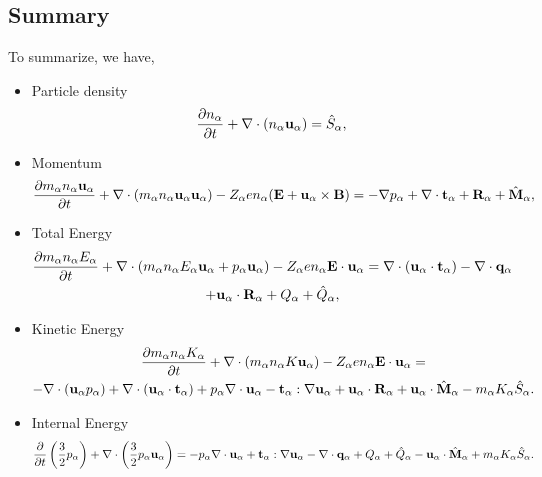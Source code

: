 \documentclass[a4paper,11pt]{report}
\begin{document}
\subsection{Summary}
To summarize, we have,
\begin{itemize}
    \item Particle density
\begin{equation}
\label{eq:cons_mass}
    \frac{\partial n_\alpha}{\partial t} + \nabla \cdot \left ( n_\alpha \mathbf{u}_\alpha \right ) = \hat{S}_\alpha,
\end{equation}

    \item Momentum
\begin{equation}
\label{eq:cons_mom}
    \frac{\partial m_\alpha n_\alpha \mathbf{u}_\alpha}{\partial t} + \nabla \cdot \left ( m_\alpha n_\alpha \mathbf{u}_\alpha \mathbf{u}_\alpha \right) - Z_\alpha e n_\alpha ( \mathbf{E} + \mathbf{u}_\alpha \times \mathbf{B} ) = - \nabla p_\alpha + \nabla \cdot \mathbf{t}_\alpha + \mathbf{R}_\alpha + \hat{\mathbf{M}}_\alpha,
\end{equation}

    \item Total Energy
\begin{multline}
\label{eq:cons_te}
\frac{\partial m_\alpha n_\alpha E_\alpha}{\partial t} + \nabla \cdot (m_\alpha n_\alpha E_\alpha \mathbf{u}_\alpha + p_\alpha \mathbf{u}_\alpha ) - Z_\alpha e n_\alpha \mathbf{E} \cdot \mathbf{u}_\alpha = \nabla \cdot ( \mathbf{u}_\alpha \cdot \mathbf{t}_\alpha ) - \nabla \cdot \mathbf{q}_\alpha \\
+ \mathbf{u}_\alpha \cdot \mathbf{R}_\alpha + Q_{\alpha} + \hat{Q}_\alpha, 
\end{multline}
    
    \item Kinetic Energy
\begin{multline}
\label{eq:cons_ke}
\frac{\partial m_\alpha n_\alpha K_\alpha}{\partial t} + \nabla \cdot ( m_\alpha n_\alpha K \mathbf{u}_\alpha ) - Z_\alpha e n_\alpha \mathbf{E} \cdot \mathbf{u}_\alpha =\\
-\nabla \cdot ( \mathbf{u}_\alpha p_\alpha ) + \nabla \cdot (\mathbf{u}_\alpha \cdot \mathbf{t}_\alpha ) + p_\alpha \nabla \cdot \mathbf{u}_\alpha - \mathbf{t}_\alpha : \nabla \mathbf{u}_\alpha + \mathbf{u}_\alpha \cdot \mathbf{R}_\alpha + \mathbf{u}_\alpha \cdot \hat{\mathbf{M}}_\alpha - m_\alpha K_\alpha \hat{S}_\alpha .
\end{multline}    
    
    \item Internal Energy
\begin{equation}
\label{eq:cons_ie}
    \frac{\partial}{\partial t} \left ( \frac{3}{2} p_\alpha \right ) + \nabla \cdot \left ( \frac{3}{2} p_\alpha \mathbf{u}_\alpha \right ) = -p_\alpha \nabla \cdot \mathbf{u}_\alpha + \mathbf{t}_\alpha : \nabla \mathbf{u}_\alpha - \nabla \cdot \mathbf{q}_\alpha + Q_{\alpha} + \hat{Q}_\alpha - \mathbf{u}_\alpha \cdot \hat{\mathbf{M}}_\alpha + m_\alpha K_\alpha \hat{S}_\alpha .  
\end{equation}

\end{itemize}
\end{document}
